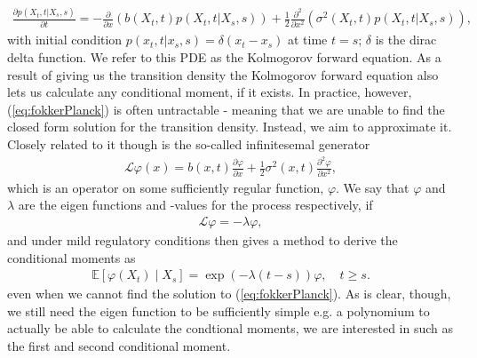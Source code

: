 \begin{align}
    \frac{\partial p(X_t, t | X_s, s)}{\partial t} = -\frac{\partial}{\partial x}\left(b(X_t, t)p(X_t, t | X_s, s)\right) + \frac{1}{2}\frac{\partial^2}{\partial x^2}\left(\sigma^2(X_t, t)p(X_t, t | X_s, s)\right),\label{eq:fokkerPlanck} 
\end{align}
with initial condition $p(x_t, t|x_s, s) = \delta(x_t - x_s)$ at time $t = s$; $\delta$ is the dirac delta function. We refer to this PDE as the Kolmogorov forward equation. As a result of giving us the transition density the Kolmogorov forward equation also lets us calculate any conditional moment, if it exists. In practice, however, (\ref{eq:fokkerPlanck}) is often untractable - meaning that we are unable to find the closed form solution for the transition density. Instead, we aim to approximate it. Closely related to it though is the so-called infinitesemal generator 
\begin{align}
    \mathcal{L}\varphi(x) = b(x, t) \frac{\partial\varphi}{\partial x} + \frac{1}{2}\sigma^2(x, t)\frac{\partial^2\varphi}{\partial x^2} \label{eq:infinitesemalGeneratorDefinition},
\end{align}
which is an operator on some sufficiently regular function, $\varphi$. We say that $\varphi$ and $\lambda$ are the eigen functions and -values for the process respectively, if 
\begin{align}
    \mathcal{L}\varphi = -\lambda\varphi,
\end{align} 
and under mild regulatory conditions \cite[theorem 1.16]{StatisticalMethodsForSDE} then gives a method to derive the conditional moments as
\begin{align}
    \mathbb{E}\left[\varphi(X_{t}) \middle | X_{s}\right] = \exp\left(-\lambda \left(t - s\right)\right)\varphi \label{eq:momentConditions}, \quad t\geq s.
\end{align}
even when we cannot find the solution to (\ref{eq:fokkerPlanck}). As is clear, though, we still need the eigen function to be sufficiently simple e.g. a polynomium to actually be able to calculate the condtional moments, we are interested in such as the first and second conditional moment.
